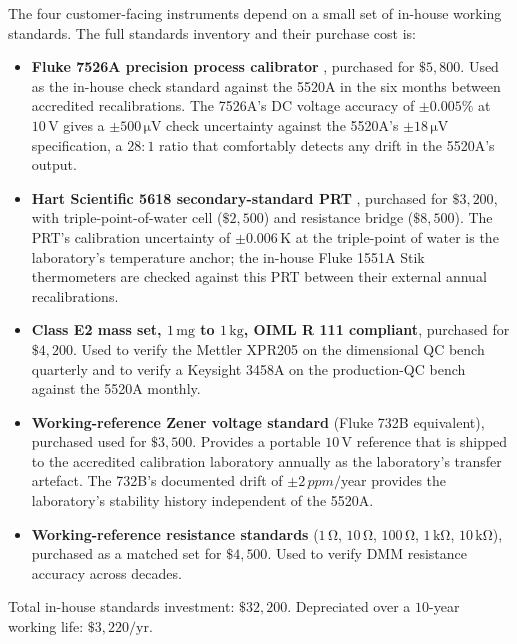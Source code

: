 The four customer-facing instruments depend on a small set of
in-house working standards. The full standards inventory and
their purchase cost is:
\begin{itemize}[leftmargin=*]
  \item \textbf{Fluke 7526A precision process calibrator}
    \cite{web:ch03t3b-fluke-7526a}, purchased for $\$5{,}800$.
    Used as the in-house check standard against the 5520A in the
    six months between accredited recalibrations. The 7526A's
    DC voltage accuracy of $\pm 0.005\%$ at $10\,\si{\volt}$
    gives a $\pm 500\,\si{\micro\volt}$ check uncertainty against
    the 5520A's $\pm 18\,\si{\micro\volt}$ specification, a
    $28{:}1$ ratio that comfortably detects any drift in the
    5520A's output.
  \item \textbf{Hart Scientific 5618 secondary-standard PRT}
    \cite{web:ch03t3b-hart-5618}, purchased for $\$3{,}200$, with
    triple-point-of-water cell ($\$2{,}500$) and resistance bridge
    ($\$8{,}500$). The PRT's calibration uncertainty of
    $\pm 0.006\,\si{\kelvin}$ at the triple-point of water is the
    laboratory's temperature anchor; the in-house Fluke 1551A
    Stik thermometers are checked against this PRT between their
    external annual recalibrations.
  \item \textbf{Class E2 mass set, $1\,\si{\milli\gram}$ to
    $1\,\si{\kilo\gram}$, OIML R 111 compliant}, purchased for
    $\$4{,}200$. Used to verify the Mettler XPR205
    \cite{web:ch03t3b-mettler-xpr} on the dimensional QC bench
    quarterly and to verify a Keysight 3458A
    \cite{web:ch03t3b-keysight-3458a} on the production-QC bench
    against the 5520A monthly.
  \item \textbf{Working-reference Zener voltage standard} (Fluke
    732B equivalent), purchased used for $\$3{,}500$. Provides a
    portable $10\,\si{\volt}$ reference that is shipped to the
    accredited calibration laboratory annually as the
    laboratory's transfer artefact. The 732B's documented drift of
    $\pm 2\,\si{ppm}/$year provides the laboratory's stability
    history independent of the 5520A.
  \item \textbf{Working-reference resistance standards}
    ($1\,\si{\ohm}$, $10\,\si{\ohm}$, $100\,\si{\ohm}$,
    $1\,\si{\kilo\ohm}$, $10\,\si{\kilo\ohm}$), purchased as a
    matched set for $\$4{,}500$. Used to verify DMM resistance
    accuracy across decades.
\end{itemize}
Total in-house standards investment: $\$32{,}200$. Depreciated
over a $10$-year working life: $\$3{,}220/\text{yr}$.

